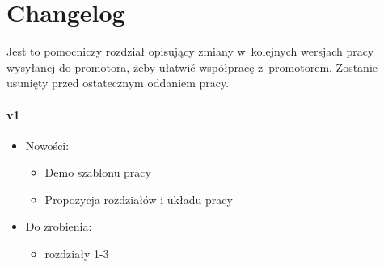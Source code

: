 \chapter*{Changelog}\label{ch:changelog}

Jest to pomocniczy rozdział opisujący zmiany w~kolejnych wersjach pracy wysyłanej do promotora, żeby ułatwić współpracę z~promotorem.
Zostanie usunięty przed ostatecznym oddaniem pracy.

\subsubsection{v1}
\begin{itemize}
    \item Nowości:
    \begin{itemize}
        \item Demo szablonu pracy
        \item Propozycja rozdziałów i układu pracy
    \end{itemize}
    \item Do zrobienia:
    \begin{itemize}
        \item rozdziały 1-3
    \end{itemize}
\end{itemize}

\cleardoublepage
{}
